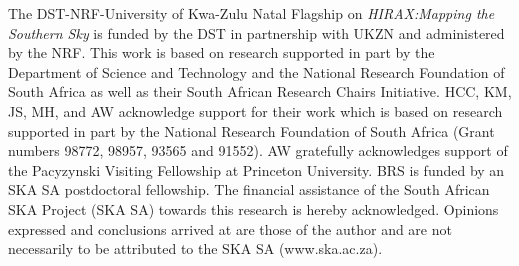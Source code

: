 \documentclass[]{spie}  %
\begin{document}
\acknowledgments %
 
The DST-NRF-University of Kwa-Zulu Natal Flagship on \textit{HIRAX:Mapping the Southern Sky} is funded by the DST in partnership with UKZN and administered by the NRF. This work is based on research supported in part by the Department of Science and Technology and the National Research Foundation of South Africa as well as their South African Research Chairs Initiative. HCC, KM, JS, MH, and AW acknowledge support for their work which is based on research supported in part by the National Research Foundation of South Africa (Grant numbers 98772, 98957, 93565 and 91552). AW gratefully acknowledges support of the Pacyzynski Visiting Fellowship at Princeton University. BRS is funded by an SKA SA postdoctoral fellowship. The financial assistance of the South African SKA Project (SKA SA) towards this research is hereby acknowledged. Opinions expressed and conclusions arrived at are those of the author and are not necessarily to be attributed to the SKA SA (www.ska.ac.za).

\end{document}

